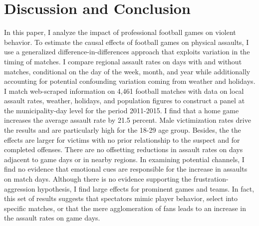 









\bigskip
\section{Discussion and Conclusion}\label{sec_soc_ext:conclusion}

In this paper, I analyze the impact of professional football games on violent behavior. To estimate the causal effects of football games on physical assaults, I use a generalized difference-in-differences approach that exploits variation in the timing of matches. I compare regional assault rates on days with and without matches, conditional on the day of the week, month, and year while additionally accounting for potential confounding variation coming from weather and holidays. I match web-scraped information on 4,461 football matches with data on local assault rates, weather, holidays, and population figures to construct a panel at the municipality-day level for the period 2011-2015. I find that a home game increases the average assault rate by 21.5 percent. Male victimization rates drive the results and are particularly high for the 18-29 age group. Besides, the the effects are larger for victims with no prior relationship to the suspect and for completed offenses. There are no offsetting reductions in assault rates on days adjacent to game days or in nearby regions. In examining potential channels, I find no evidence that emotional cues are responsible for the increase in assaults on match days. Although there is no evidence supporting the frustration-aggression hypothesis, I find large effects for prominent games and teams. In fact, this set of results suggests that spectators mimic player behavior, select into specific matches, or that the mere agglomeration of fans leads to an increase in the assault rates on game days. 




